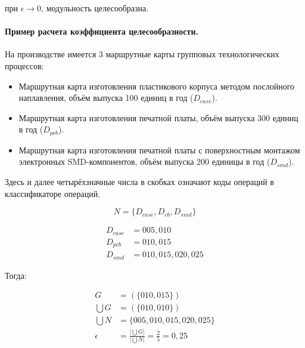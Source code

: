 \noindent при $\epsilon \rightarrow 0$, модульность целесообразна.

\paragraph{Пример расчета коэффициента целесообразности.}

На производстве имеется 3 маршрутные карты групповых технологических процессов:

\begin{itemize}
	\item Маршрутная карта изготовления пластикового корпуса методом послойного наплавления, объём выпуска 100 единиц в год ($D_{case}$).
	\item Маршрутная карта изготовления печатной платы, объём выпуска 300 единиц в год ($D_{pcb}$).
	\item Маршрутная карта изготовления печатной платы с поверхностным монтажом электронных SMD-компонентов, объём выпуска 200 единицы в год ($D_{smd}$).
\end{itemize}

Здесь и далее четырёхзначные числа в скобках означают коды операций в классификаторе операций.

\[
N = \{D_{case}, D_{cb}, D_{smd}\}
\]

\begin{equation}
\begin{split}
	D_{case} &= {005, 010} \\
	D_{pcb} &= {010, 015} \\
	D_{smd} &= {010, 015, 020, 025}
\end{split}
\end{equation}

\noindent Тогда:

\begin{equation}
\begin{split}
	G &= (\{010, 015\}) \\
	\bigcup G &= (\{010, 010\}) \\
	\bigcup N &= \{005, 010, 015, 020, 025\} \\
	\epsilon &= \frac{\big|\bigcup G \big|}{\big|\bigcup N \big|} = \frac{2}{5} = 0,25
	\end{split}
\end{equation}



%

